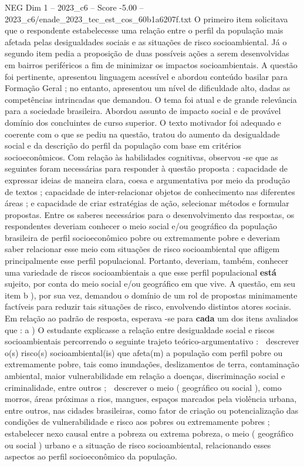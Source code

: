 \begin{textsample}{NEG Dim 1 – 2023\_c6 – Score -5.00 – 2023\_c6/enade\_2023\_tec\_est\_cos\_60b1a6207f.txt}
O primeiro item solicitava que o respondente estabelecesse uma relação entre o perfil da população mais afetada pelas desigualdades sociais e as situações de risco socioambiental.
Já o segundo item pedia a proposição de duas possíveis ações a serem desenvolvidas em bairros periféricos a fim de minimizar os impactos socioambientais.
A questão foi pertinente, apresentou linguagem acessível e abordou conteúdo basilar para Formação Geral ; no entanto, apresentou um nível de dificuldade alto, dadas as competências intrincadas que demandou.
O tema foi atual e de grande relevância para a sociedade brasileira.
Abordou assunto de impacto social e de provável domínio dos concluintes de curso superior.
O texto motivador foi adequado e coerente com o que se pediu na questão, tratou do aumento da desigualdade social e da descrição do perfil da população com base em critérios socioeconômicos.
Com relação às habilidades cognitivas, observou -se que as seguintes foram necessárias para responder à questão proposta : capacidade de expressar ideias de maneira clara, coesa e argumentativa por meio da produção de textos ; capacidade de inter-relacionar objetos de conhecimento nas diferentes áreas ; e capacidade de criar estratégias de ação, selecionar métodos e formular propostas.
Entre os saberes necessários para o desenvolvimento das respostas, os respondentes deveriam conhecer o meio social e/ou geográfico da população brasileira de perfil socioeconômico pobre ou extremamente pobre e deveriam saber relacionar esse meio com situações de risco socioambiental que afligem principalmente esse perfil populacional.
Portanto, deveriam, também, conhecer uma variedade de riscos socioambientais a que esse perfil populacional \textbf{está} sujeito, por conta do meio social e/ou geográfico em que vive.
A questão, em seu item b ), por sua vez, demandou o domínio de um rol de propostas minimamente factíveis para reduzir tais situações de risco, envolvendo distintos atores sociais.
Em relação ao padrão de resposta, esperava -se para \textbf{cada} um dos itens avaliados que : a ) O estudante explicasse a relação entre desigualdade social e riscos socioambientais percorrendo o seguinte trajeto teórico-argumentativo :  descrever o(s) risco(s) socioambiental(is) que afeta(m) a população com perfil pobre ou extremamente pobre, tais como inundações, deslizamentos de terra, contaminação ambiental, maior vulnerabilidade em relação a doenças, discriminação social e criminalidade, entre outros ;  descrever o meio ( geográfico ou social ), como morros, áreas próximas a rios, mangues, espaços marcados pela violência urbana, entre outros, nas cidades brasileiras, como fator de criação ou potencialização das condições de vulnerabilidade e risco aos pobres ou extremamente pobres ;  estabelecer nexo causal entre a pobreza ou extrema pobreza, o meio ( geográfico ou social ) urbano e a situação de risco socioambiental, relacionando esses aspectos ao perfil socioeconômico da população.

\end{textsample}
